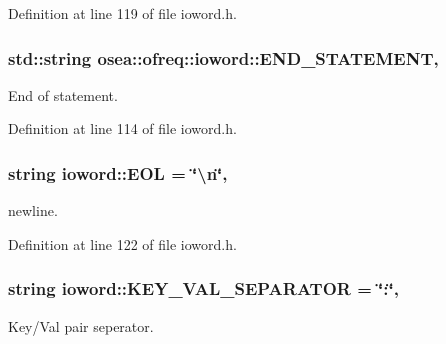 Definition at line 119 of file ioword.\-h.

\hypertarget{classosea_1_1ofreq_1_1ioword_acc42e2082fae1f23f60065e7c384e723}{
\subsubsection[{E\-N\-D\-\_\-\-S\-T\-A\-T\-E\-M\-E\-N\-T}]{\setlength{\rightskip}{0pt plus 5cm}std\-::string osea\-::ofreq\-::ioword\-::\-E\-N\-D\-\_\-\-S\-T\-A\-T\-E\-M\-E\-N\-T\hspace{0.3cm}{\ttfamily [static]}, {\ttfamily [protected]}}}\label{classosea_1_1ofreq_1_1ioword_acc42e2082fae1f23f60065e7c384e723}
End of statement. 

Definition at line 114 of file ioword.\-h.

\hypertarget{classosea_1_1ofreq_1_1ioword_ab0b5cdd9f31f7a0b506db27812fe978e}{
\subsubsection[{E\-O\-L}]{\setlength{\rightskip}{0pt plus 5cm}string ioword\-::\-E\-O\-L = \char`\"{}\textbackslash{}n\char`\"{}\hspace{0.3cm}{\ttfamily [static]}, {\ttfamily [protected]}}}\label{classosea_1_1ofreq_1_1ioword_ab0b5cdd9f31f7a0b506db27812fe978e}
newline. 

Definition at line 122 of file ioword.\-h.

\hypertarget{classosea_1_1ofreq_1_1ioword_a2c4ef10050934d8d6e8510560725e4eb}{
\subsubsection[{K\-E\-Y\-\_\-\-V\-A\-L\-\_\-\-S\-E\-P\-A\-R\-A\-T\-O\-R}]{\setlength{\rightskip}{0pt plus 5cm}string ioword\-::\-K\-E\-Y\-\_\-\-V\-A\-L\-\_\-\-S\-E\-P\-A\-R\-A\-T\-O\-R = \char`\"{}\-:\char`\"{}\hspace{0.3cm}{\ttfamily [static]}, {\ttfamily [protected]}}}\label{classosea_1_1ofreq_1_1ioword_a2c4ef10050934d8d6e8510560725e4eb}
Key/\-Val pair seperator. 

